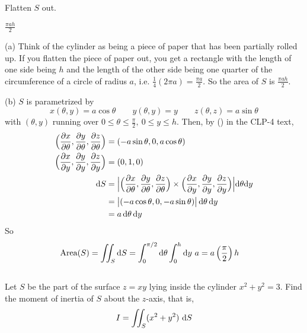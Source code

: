 \begin{hint} 
Flatten $S$ out.
\end{hint}

\begin{answer} 
$\frac{\pi ah}{2}$
\end{answer}

\begin{solution}
(a) 
Think of the cylinder as being a piece of paper that has been partially rolled 
up. If you flatten the piece of paper out, you get a rectangle
with the length of one side being $h$ and the length of the other side
being one quarter of the circumference of a circle of radius $a$,
i.e. $\frac{1}{4}(2\pi a)=\frac{\pi a}{2}$. So the area of $S$ is
$\frac{\pi a h}{2}$.

(b) $S$ is parametrized by
\begin{equation*}
x(\theta,y)=a\cos\theta\qquad
y(\theta,y)=y\qquad
z(\theta,z)=a\sin\theta
\end{equation*}
with $(\theta,y)$ running over 
$0\le \theta\le \frac{\pi}{2},\ 0\le y\le h$. Then,
by () in the CLP-4 text,
\begin{align*}
\Big(\pdiff{x}{\theta},\pdiff{y}{\theta},\pdiff{z}{\theta}\Big)
&=(-a\sin\theta,0,a\cos\theta)\\
\Big(\pdiff{x}{y},\pdiff{y}{y},\pdiff{z}{y}\Big)
&=(0,1,0)\\
\dee{S}
&=
 \Big|\Big(\pdiff{x}{\theta},\pdiff{y}{\theta},\pdiff{z}{\theta}\Big)
\times\Big(\pdiff{x}{y},\pdiff{y}{y},\pdiff{z}{y}\Big)\Big|
     \dee{\theta} \dee{y}\\
&=\big|(-a\cos\theta,0,-a\sin\theta)\big|\,\dee{\theta}\,\dee{y}\\
&=a\,\dee{\theta}\,\dee{y}
\end{align*}
So
\begin{align*}
\text{Area}(S)&=\iint_S\mathrm{d}S
=\int_0^{\pi/2}\mathrm{d}\theta\int_0^h\mathrm{d}y\ a 
=a\left(\frac{\pi}{2}\right)h
\end{align*}

\end{solution}


\subsection*{\Procedural}

\begin{question}
Let $S$ be the part of the surface $z = xy$ lying inside the cylinder 
$x^2 + y^2 = 3$.  Find the moment of inertia of $S$ about the 
$z$-axis, that is,  
\begin{equation*}
      I =  \dblInt_S (x^2 + y^2)\ \dee{S} 
\end{equation*}
\end{question}

